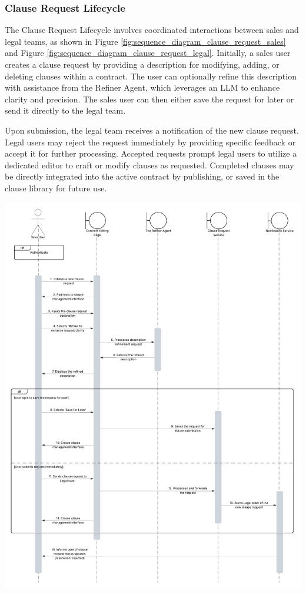 \subsubsection{Clause Request Lifecycle}

The Clause Request Lifecycle involves coordinated interactions between sales and legal teams, as shown in Figure \ref{fig:sequence_diagram_clause_request_sales} and Figure \ref{fig:sequence_diagram_clause_request_legal}. Initially, a sales user creates a clause request by providing a description for modifying, adding, or deleting clauses within a contract. The user can optionally refine this description with assistance from the Refiner Agent, which leverages an LLM to enhance clarity and precision. The sales user can then either save the request for later or send it directly to the legal team.\mynewline

Upon submission, the legal team receives a notification of the new clause request. Legal users may reject the request immediately by providing specific feedback or accept it for further processing. Accepted requests prompt legal users to utilize a dedicated editor to craft or modify clauses as requested. Completed clauses may be directly integrated into the active contract by publishing, or saved in the clause library for future use.

\begin{center}
    \centering
    \includegraphics[width=1\textwidth]{Images/Sequence Diagram - Sales - Clause Request.png}
    \label{fig:sequence_diagram_clause_request_sales}
\end{center}

